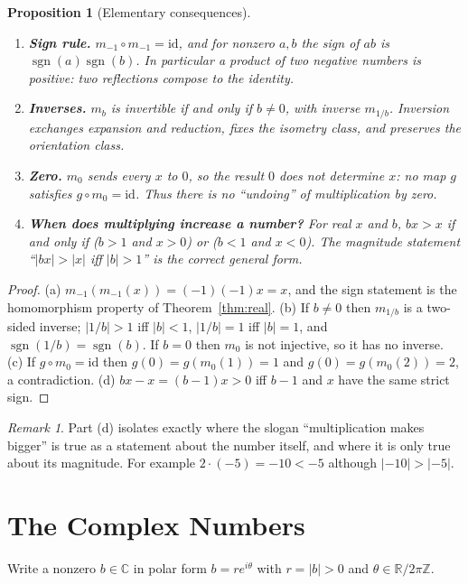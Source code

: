 \documentclass[12pt]{article}
\newtheorem{proposition}[theorem]{Proposition}
\theoremstyle{definition}
\theoremstyle{remark}
\newtheorem{remark}[theorem]{Remark}
\newcommand{\R}{\mathbb{R}}
\newcommand{\C}{\mathbb{C}}
\newcommand{\sgn}{\operatorname{sgn}}
\begin{document}
\begin{proposition}[Elementary consequences]\label{prop:consequences}
\begin{enumerate}
\item[\textup{(a)}] \textbf{Sign rule.} $m_{-1}\circ m_{-1}=\mathrm{id}$, and for nonzero $a,b$ the sign of $ab$ is $\sgn(a)\sgn(b)$. In particular a product of two negative numbers is positive: two reflections compose to the identity.
\item[\textup{(b)}] \textbf{Inverses.} $m_b$ is invertible if and only if $b\ne0$, with inverse $m_{1/b}$. Inversion exchanges expansion and reduction, fixes the isometry class, and preserves the orientation class.
\item[\textup{(c)}] \textbf{Zero.} $m_0$ sends every $x$ to $0$, so the result $0$ does not determine $x$: no map $g$ satisfies $g\circ m_0=\mathrm{id}$. Thus there is no ``undoing'' of multiplication by zero.
\item[\textup{(d)}] \textbf{When does multiplying increase a number?} For real $x$ and $b$, $bx>x$ if and only if ($b>1$ and $x>0$) or ($b<1$ and $x<0$). The magnitude statement ``$|bx|>|x|$ iff $|b|>1$'' is the correct general form.
\end{enumerate}
\end{proposition}
\begin{proof}
(a) $m_{-1}(m_{-1}(x))=(-1)(-1)x=x$, and the sign statement is the homomorphism property of Theorem~\ref{thm:real}. (b) If $b\ne0$ then $m_{1/b}$ is a two-sided inverse; $|1/b|>1$ iff $|b|<1$, $|1/b|=1$ iff $|b|=1$, and $\sgn(1/b)=\sgn(b)$. If $b=0$ then $m_0$ is not injective, so it has no inverse. (c) If $g\circ m_0=\mathrm{id}$ then $g(0)=g(m_0(1))=1$ and $g(0)=g(m_0(2))=2$, a contradiction. (d) $bx-x=(b-1)x>0$ iff $b-1$ and $x$ have the same strict sign.
\end{proof}

\begin{remark}
Part (d) isolates exactly where the slogan ``multiplication makes bigger'' is true as a statement about the number itself, and where it is only true about its magnitude. For example $2\cdot(-5)=-10<-5$ although $|{-10}|>|{-5}|$.
\end{remark}

\section{The Complex Numbers}\label{sec:complex}
Write a nonzero $b\in\C$ in polar form $b=re^{i\theta}$ with $r=|b|>0$ and $\theta\in\R/2\pi\mathbb{Z}$.
\end{document}
